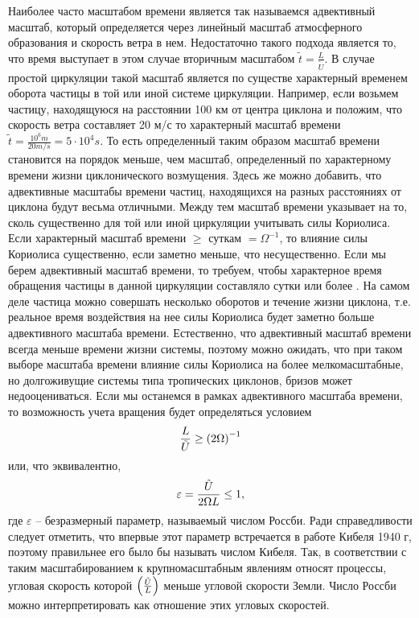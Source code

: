 Наиболее часто масштабом времени является так называемся адвективный масштаб, который определяется через линейный масштаб атмосферного образования и скорость ветра в нем. Недостаточно такого подхода является то, что время выступает в этом случае вторичным масштабом $\tilde{t}=\frac{L}{\tilde{U}}$. В случае простой циркуляции такой масштаб является по существе характерный временем оборота частицы в той или иной системе циркуляции. Например, если возьмем частицу, находящуюся на расстоянии 100 км от центра циклона и положим, что скорость ветра составляет 20 м/с то характерный масштаб времени $\tilde{t}=\frac{10^6m}{20 m/s}=5\cdot 10^4s$. То есть определенный таким образом масштаб времени становится на порядок меньше, чем масштаб, определенный по характерному времени жизни циклонического возмущения. Здесь же можно добавить, что адвективные масштабы времени частиц, находящихся на разных расстояниях от циклона будут весьма отличными. Между тем масштаб времени указывает на то, сколь существенно для той или иной циркуляции учитывать силы Кориолиса. Если характерный масштаб времени $\geq$ суткам $=\Omega^{-1}$, то влияние силы Кориолиса существенно, если заметно меньше, что несущественно. Если мы берем адвективный масштаб времени, то требуем, чтобы характерное время обращения частицы в данной циркуляции составляло сутки или более . На самом деле частица можно совершать несколько оборотов и течение жизни циклона, т.е. реальное время воздействия на нее силы Кориолиса будет заметно больше адвективного масштаба времени. Естественно, что адвективный масштаб времени всегда меньше времени жизни системы, поэтому можно ожидать, что при таком выборе масштаба времени влияние силы Кориолиса на более мелкомасштабные, но долгоживущие системы типа тропических циклонов, бризов может недооцениваться. Если мы останемся в рамках адвективного масштаба времени, то возможность учета вращения будет определяться условием 
\begin{equation}
    \frac{L}{\Tilde{U}}\geq \left( 2\Omega \right)^{-1}
\end{equation}
или, что эквивалентно, 
\begin{equation}
    \varepsilon=\frac{\Tilde{U}}{2\Omega L}\leq 1,
\end{equation}
где $\varepsilon$ -- безразмерный параметр, называемый числом Россби. Ради справедливости следует отметить, что впервые этот параметр встречается в работе {\color{warn} Кибеля 1940 г}, поэтому правильнее его было бы называть числом Кибеля. Так, в соответствии с таким масштабированием к крупномасштабным явлениям относят процессы, угловая скорость которой $\left( \frac{\Tilde{U}}{L} \right)$ меньше угловой скорости Земли. Число Россби можно интерпретировать как отношение этих угловых скоростей.

